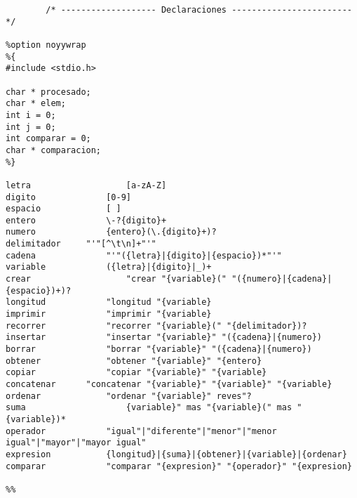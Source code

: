 \documentclass[11pt,a4paper]{article}
\begin{document}
		\begin{lstlisting}
		/* ------------------- Declaraciones ------------------------ */

%option noyywrap
%{
#include <stdio.h>

char * procesado;
char * elem;
int i = 0;
int j = 0;
int comparar = 0;
char * comparacion;
%}

letra					[a-zA-Z]
digito				[0-9]
espacio				[ ]
entero				\-?{digito}+
numero				{entero}(\.{digito}+)?
delimitador		"'"[^\t\n]+"'"
cadena				"'"({letra}|{digito}|{espacio})*"'"
variable			({letra}|{digito}|_)+
crear					"crear "{variable}(" "({numero}|{cadena}|{espacio})+)?
longitud			"longitud "{variable}
imprimir			"imprimir "{variable}
recorrer			"recorrer "{variable}(" "{delimitador})?
insertar			"insertar "{variable}" "({cadena}|{numero})
borrar				"borrar "{variable}" "({cadena}|{numero})
obtener				"obtener "{variable}" "{entero}
copiar				"copiar "{variable}" "{variable}
concatenar		"concatenar "{variable}" "{variable}" "{variable}
ordenar				"ordenar "{variable}" reves"?
suma					{variable}" mas "{variable}(" mas "{variable})*
operador			"igual"|"diferente"|"menor"|"menor igual"|"mayor"|"mayor igual"
expresion			{longitud}|{suma}|{obtener}|{variable}|{ordenar}
comparar			"comparar "{expresion}" "{operador}" "{expresion}

%%


\end{lstlisting}
\end{document}
